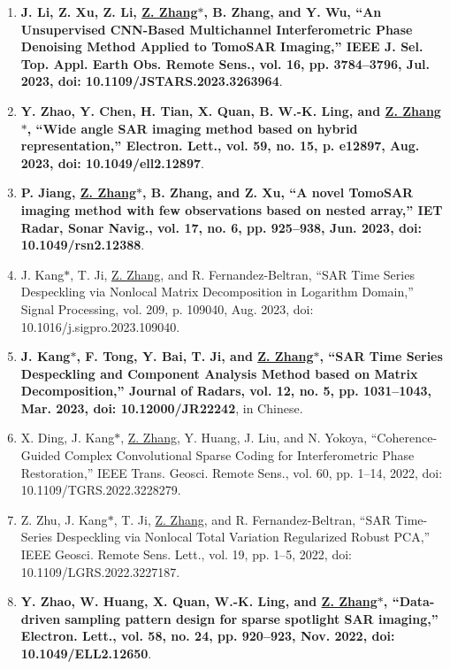 \documentclass[paper=a4,fontsize=11pt]{scrartcl}
\begin{document}
\begin{enumerate}
\item \textbf{J. Li, Z. Xu, Z. Li, \underline{Z. Zhang$\ast$}, B. Zhang, and Y. Wu, ``An Unsupervised CNN-Based Multichannel Interferometric Phase Denoising Method Applied to TomoSAR Imaging,'' IEEE J. Sel. Top. Appl. Earth Obs. Remote Sens., vol. 16, pp. 3784–3796, Jul. 2023, doi: 10.1109/JSTARS.2023.3263964}.

\item \textbf{Y. Zhao, Y. Chen, H. Tian, X. Quan, B. W.-K. Ling, and \underline{Z. Zhang$\ast$}, ``Wide angle SAR imaging method based on hybrid representation,'' Electron. Lett., vol. 59, no. 15, p. e12897, Aug. 2023, doi: 10.1049/ell2.12897}.

\item \textbf{P. Jiang, \underline{Z. Zhang$\ast$}, B. Zhang, and Z. Xu, ``A novel TomoSAR imaging method with few observations based on nested array,'' IET Radar, Sonar Navig., vol. 17, no. 6, pp. 925–938, Jun. 2023, doi: 10.1049/rsn2.12388}.

\item J. Kang$\ast$, T. Ji, \underline{Z. Zhang}, and R. Fernandez-Beltran, ``SAR Time Series Despeckling via Nonlocal Matrix Decomposition in Logarithm Domain,'' Signal Processing, vol. 209, p. 109040, Aug. 2023, doi: 10.1016/j.sigpro.2023.109040.

\item \textbf{J. Kang$\ast$, F. Tong, Y. Bai, T. Ji, and \underline{Z. Zhang$\ast$}, ``SAR Time Series Despeckling and Component Analysis Method based on Matrix Decomposition,'' Journal of Radars, vol. 12, no. 5, pp. 1031–1043, Mar. 2023, doi: 10.12000/JR22242}, in Chinese.

\item X. Ding, J. Kang$\ast$, \underline{Z. Zhang}, Y. Huang, J. Liu, and N. Yokoya, ``Coherence-Guided Complex Convolutional Sparse Coding for Interferometric Phase Restoration,'' IEEE Trans. Geosci. Remote Sens., vol. 60, pp. 1–14, 2022, doi: 10.1109/TGRS.2022.3228279.

\item Z. Zhu, J. Kang$\ast$, T. Ji, \underline{Z. Zhang}, and R. Fernandez-Beltran, ``SAR Time-Series Despeckling via Nonlocal Total Variation Regularized Robust PCA,'' IEEE Geosci. Remote Sens. Lett., vol. 19, pp. 1–5, 2022, doi: 10.1109/LGRS.2022.3227187.​
	
\item \textbf{Y. Zhao, W. Huang, X. Quan, W.-K. Ling, and \underline{Z. Zhang$\ast$}, ``Data-driven sampling pattern design for sparse spotlight SAR imaging,'' Electron. Lett., vol. 58, no. 24, pp. 920–923, Nov. 2022, doi: 10.1049/ELL2.12650}.


\end{enumerate}
\end{document}
